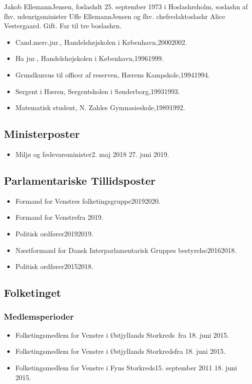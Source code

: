 \documentclass[11pt, a4paper]{awesome-cv}
\begin{document}
\makecvheader[R]
\makelettertitle
\begin{cvletter}
Jakob EllemannJensen, foslashdt 25. september 1973 i Hoslashrsholm, soslashn af fhv. udenrigsminister Uffe EllemannJensen og fhv. chefredaktoslashr Alice Vestergaard. Gift. Far til tre boslashrn.

\begin{itemize}
\item Cand.merc.jur., Handelshøjskolen i København,20002002.
\item Ha jur., Handelshøjskolen i København,19961999.
\item Grundkursus til officer af reserven, Hærens Kampskole,19941994.
\item Sergent i Hæren, Sergentskolen i Sønderborg,19931993.
\item Matematisk student, N. Zahles Gymnasieskole,19891992.
\end{itemize}
\subsection*{Ministerposter}
\begin{itemize}
\item Miljø og fødevareminister2. maj 2018  27. juni 2019.
\end{itemize}
\subsection*{Parlamentariske Tillidsposter}
\begin{itemize}
\item Formand for Venstres folketingsgruppe20192020.
\item Formand for Venstrefra 2019.
\item Politisk ordfører20192019.
\item Næstformand for Dansk Interparlamentarisk Gruppes bestyrelse20162018.
\item Politisk ordfører20152018.
\end{itemize}
\subsection*{Folketinget}
\subsubsection*{Medlemsperioder}
\begin{itemize}
\item Folketingsmedlem for Venstre i Østjyllands Storkreds fra 18. juni 2015.
\item Folketingsmedlem for Venstre i Østjyllands Storkredsfra 18. juni 2015.
\item Folketingsmedlem for Venstre i Fyns Storkreds15. september 2011  18. juni 2015.
\end{itemize}

\end{cvletter}
\end{document}
